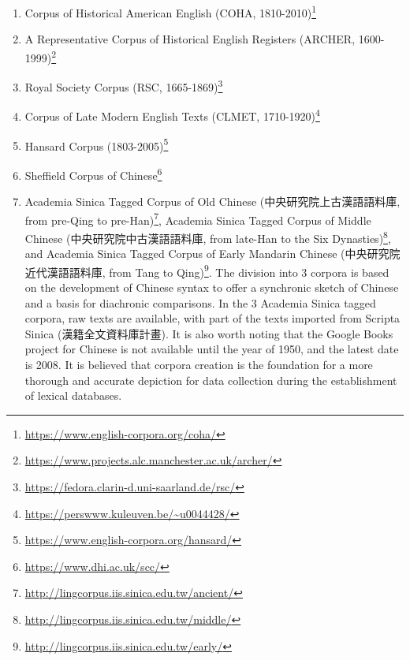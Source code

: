 \begin{enumerate}[label={(\arabic*)},nolistsep]
    \item Corpus of Historical American English (COHA, 1810-2010)\footnote{\url{https://www.english-corpora.org/coha/}}
    \item A Representative Corpus of Historical English Registers (ARCHER, 1600-1999)\footnote{\url{https://www.projects.alc.manchester.ac.uk/archer/}}
    \item Royal Society Corpus (RSC, 1665-1869)\footnote{\url{https://fedora.clarin-d.uni-saarland.de/rsc/}}
    \item Corpus of Late Modern English Texts (CLMET, 1710-1920)\footnote{\url{https://perswww.kuleuven.be/~u0044428/}}
    \item Hansard Corpus (1803-2005)\footnote{\url{https://www.english-corpora.org/hansard/}}
    \item Sheffield Corpus of Chinese\footnote{\url{https://www.dhi.ac.uk/scc/}}
    \item Academia Sinica Tagged Corpus of Old Chinese (中央研究院上古漢語語料庫, from pre-Qing to pre-Han)\footnote{\url{http://lingcorpus.iis.sinica.edu.tw/ancient/}}, Academia Sinica Tagged Corpus of Middle Chinese (中央研究院中古漢語語料庫, from late-Han to the Six Dynasties)\footnote{\url{http://lingcorpus.iis.sinica.edu.tw/middle/}}, and Academia Sinica Tagged Corpus of Early Mandarin Chinese (中央研究院近代漢語語料庫, from Tang to Qing)\footnote{\url{http://lingcorpus.iis.sinica.edu.tw/early/}}. The division into 3 corpora is based on the development of Chinese syntax to offer a synchronic sketch of Chinese and a basis for diachronic comparisons. In the 3 Academia Sinica tagged corpora, raw texts are available, with part of the texts imported from Scripta Sinica (漢籍全文資料庫計畫). It is also worth noting that the Google Books project for Chinese is not available until the year of 1950, and the latest date is 2008. It is believed that corpora creation is the foundation for a more thorough and accurate depiction for data collection during the establishment of lexical databases.
\end{enumerate}
\vspace*{\baselineskip}

